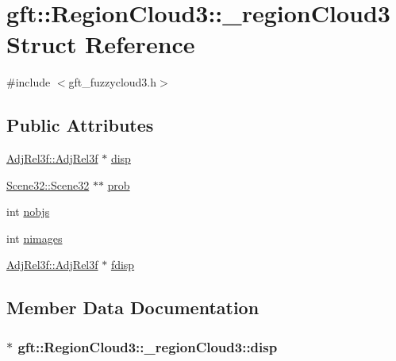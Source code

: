 \hypertarget{structgft_1_1RegionCloud3_1_1__regionCloud3}{}\section{gft\+:\+:Region\+Cloud3\+:\+:\+\_\+region\+Cloud3 Struct Reference}
\label{structgft_1_1RegionCloud3_1_1__regionCloud3}


{\ttfamily \#include $<$gft\+\_\+fuzzycloud3.\+h$>$}

\subsection*{Public Attributes}
\begin{DoxyCompactItemize}
\item 
\hyperlink{namespacegft_1_1AdjRel3f_a83ef20d6a560143af34ad546deafbe5f}{Adj\+Rel3f\+::\+Adj\+Rel3f} $\ast$ \hyperlink{structgft_1_1RegionCloud3_1_1__regionCloud3_a8c55031707f6f59498992f8c1ecd4e2c}{disp}
\item 
\hyperlink{namespacegft_1_1Scene32_ae492ac529c9149889605a7bebd647c46}{Scene32\+::\+Scene32} $\ast$$\ast$ \hyperlink{structgft_1_1RegionCloud3_1_1__regionCloud3_a80d4c38584c9d6d720c721ebd4d13b06}{prob}
\item 
int \hyperlink{structgft_1_1RegionCloud3_1_1__regionCloud3_a468bf8f45dcc2dad9a1e744027f161d1}{nobjs}
\item 
int \hyperlink{structgft_1_1RegionCloud3_1_1__regionCloud3_ab85f7c4725ed3a18976e5fe022f087bb}{nimages}
\item 
\hyperlink{namespacegft_1_1AdjRel3f_a83ef20d6a560143af34ad546deafbe5f}{Adj\+Rel3f\+::\+Adj\+Rel3f} $\ast$ \hyperlink{structgft_1_1RegionCloud3_1_1__regionCloud3_a3f63f3c56e6794f68d38e427bbabb8e4}{fdisp}
\end{DoxyCompactItemize}


\subsection{Member Data Documentation}
\subsubsection[{\texorpdfstring{disp}{disp}}]{$\ast$ gft\+::\+Region\+Cloud3\+::\+\_\+region\+Cloud3\+::disp}\hypertarget{structgft_1_1RegionCloud3_1_1__regionCloud3_a8c55031707f6f59498992f8c1ecd4e2c}{}\label{structgft_1_1RegionCloud3_1_1__regionCloud3_a8c55031707f6f59498992f8c1ecd4e2c}
